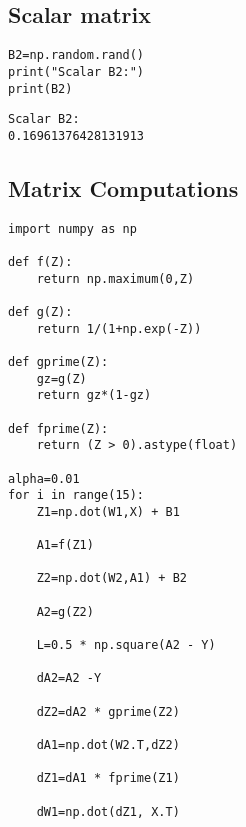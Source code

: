 \subsection{Scalar matrix}
\vspace{-.6cm}
\begin{code}
\begin{lstlisting}
B2=np.random.rand()
print("Scalar B2:")
print(B2)
\end{lstlisting}
\end{code}
\vspace{-1cm}
\begin{verbatim}
Scalar B2:
0.16961376428131913
\end{verbatim}
\vspace{-.6cm}
\newpage
\subsection{Matrix Computations}

\begin{lstlisting}
import numpy as np

def f(Z):
    return np.maximum(0,Z)
    
def g(Z):
    return 1/(1+np.exp(-Z))
    
def gprime(Z):
    gz=g(Z)
    return gz*(1-gz)
    
def fprime(Z):
    return (Z > 0).astype(float)

alpha=0.01
for i in range(15):
    Z1=np.dot(W1,X) + B1

    A1=f(Z1)

    Z2=np.dot(W2,A1) + B2

    A2=g(Z2)

    L=0.5 * np.square(A2 - Y)

    dA2=A2 -Y

    dZ2=dA2 * gprime(Z2)

    dA1=np.dot(W2.T,dZ2)

    dZ1=dA1 * fprime(Z1)

    dW1=np.dot(dZ1, X.T)
\end{lstlisting}

\newpage

